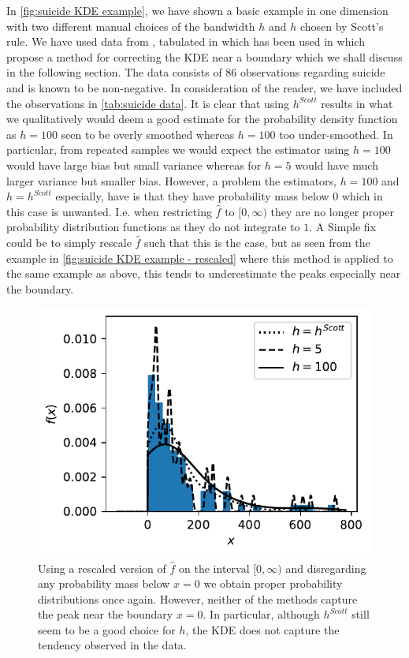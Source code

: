 \documentclass[../Thesis.tex]{subfiles}
\begin{document}
In \autoref{fig:suicide KDE example}, we have shown a basic example in one dimension with two different manual choices of the bandwidth $h$ and $h$ chosen by Scott's rule. We have used data from \cite{Density-Estimation-and-Suicide-Risks-in-Psychiatric-Treatment}, tabulated in \cite{Silverman86} which has been used in \cite{Jones1993SimpleBC} which propose a method for correcting the KDE near a boundary which we shall discuss in the following section. The data consists of $86$ observations regarding suicide and is known to be non-negative. In consideration of the reader, we have included the observations in \autoref{tab:suicide data}. It is clear that using $h^{Scott}$ results in what we qualitatively would deem a good estimate for the probability density function as $h = 100$ seen to be overly smoothed whereas $h = 100$ too under-smoothed. In particular, from repeated samples we would expect the estimator using $h= 100$ would have large bias but small variance whereas for $h = 5$ would have much larger variance but smaller bias. However, a problem the estimators, $h = 100$ and $h = h^{Scott}$ especially, have is that they have probability mass below $0$ which in this case is unwanted. I.e. when restricting $\hat{f}$ to $[0,\infty)$ they are no longer proper probability distribution functions as they do not integrate to $1$. A Simple fix could be to simply rescale $\hat{f}$ such that this is the case, but as seen from the example in \autoref{fig:suicide KDE example - rescaled} where this method is applied to the same example as above, this tends to underestimate the peaks especially near the boundary.

\begin{figure}[ht]
    \centering
    \includegraphics[width = .6\linewidth]{figures/MI estimation/suicide data example - rescaled.pdf}
    \caption{Using a rescaled version of $\hat{f}$ on the interval $[0,\infty)$ and disregarding any probability mass below $x=0$ we obtain proper probability distributions once again. However, neither of the methods capture the peak near the boundary $x=0$. In particular, although $h^{Scott}$ still seem to be a good choice for $h$, the KDE does not capture the tendency observed in the data.}
    \label{fig:suicide KDE example - rescaled}
\end{figure}
\end{document}
